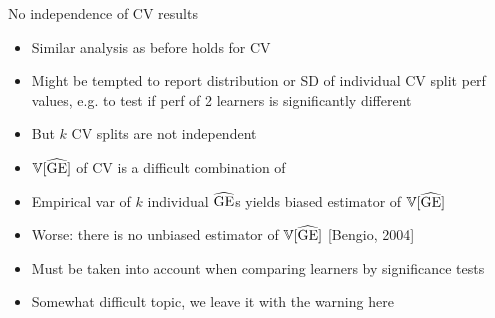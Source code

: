 \begin{vbframe}{No independence of CV results}
\begin{itemize}
    \item Similar analysis as before holds for CV
    \item Might be tempted to report distribution or SD 
        of individual CV split perf values, e.g.
        to test if perf of 2 learners is significantly different
\item But $k$ CV splits are not independent
\framebreak
\item $\mathbb{V}[\widehat{\mathrm{GE}}]$ of CV is a difficult combination of 
\begin{itemize}
\end{itemize}
\item Empirical var of $k$ individual $\widehat{\mathrm{GE}}$s yields biased 
estimator of $\mathbb{V}[\widehat{\mathrm{GE}}]$ 
\item Worse: there is no unbiased estimator of $\mathbb{V}[\widehat{\mathrm{GE}}]$ [Bengio, 2004]
\item Must be taken into account when comparing learners by significance tests
\item Somewhat difficult topic, we leave it with the warning here

\end{itemize}
\end{vbframe}




